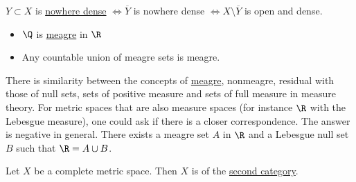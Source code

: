 \documentclass{article}
\renewcommand{\emptyset}{\varnothing}
\DeclareMathOperator{\interior}{int}
\begin{document}

\begin{fact}
    $Y \subset X$ is \hyperlink{def:meagre}{nowhere dense} $\iff \overline{Y}$ is nowhere dense $\iff X \setminus \overline{Y}$ is open and dense.
\end{fact}

\begin{eg}
    \leavevmode
    \begin{itemize}
        \item $\Q$ is \hyperlink{def:meagre}{meagre} in $\R$
        \item Any countable union of meagre sets is meagre.
    \end{itemize}
\end{eg}

\begin{remark}
    There is similarity between the concepts of \hyperlink{def:measure}{meagre}, nonmeagre, residual with those of null sets, sets of positive measure and sets of full measure in measure theory.
    For metric spaces that are also measure spaces (for instance $\R$ with the Lebesgue measure), one could ask if there is a closer correspondence.
    The answer is negative in general.
    There exists a meagre set $A$ in $\R$ and a Lebesgue null set $B$ such that $\R = A \cup B$.
\end{remark}

\begin{cor}
    Let $X$ be a complete metric space. Then $X$ is of the \hyperlink{def:meagre}{second category}.
\end{cor}
\end{document}
